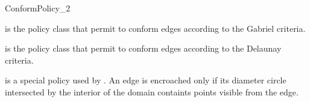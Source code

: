 \begin{ccRefConcept}{ConformPolicy_2}
\ccCreation
{}



\ccHasModels
{} is the policy class that permit to
conform edges according to the Gabriel criteria.

 is the policy class that permit to
conform edges according to the Delaunay criteria.

 is a special policy used by
. An edge is encroached only if its diameter circle
intersected by the interior of the domain containts points visible
from the edge.




\end{ccRefConcept}